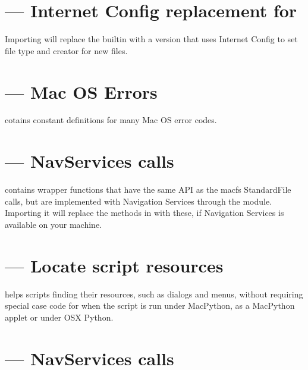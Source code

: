 \section{ --- Internet Config replacement for }

Importing  will replace the builtin 
with a version that uses Internet Config to set file type and creator
for new files.


\section{ --- Mac OS Errors}

 cotains constant definitions for many Mac OS error codes.


\section{ --- NavServices calls}


 contains wrapper functions that have the same API as the macfs 
StandardFile calls, but are implemented with Navigation Services through the
 module. Importing it 
will replace the methods in  with these,
if Navigation Services is 
available on your machine.


\section{ --- Locate script resources}

 helps scripts finding their resources, such as
dialogs and menus, without requiring special case code for when the
script is run under MacPython, as a MacPython applet or under OSX Python.

\section{ --- NavServices calls}

